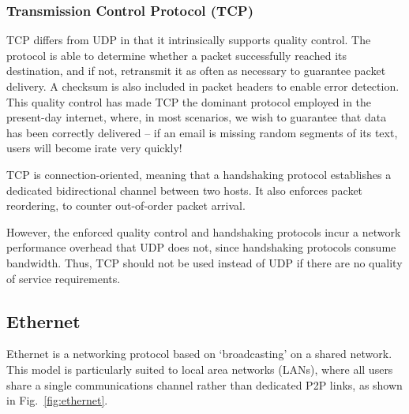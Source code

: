 \documentclass[aps,rmp,twocolumn,amsmath,amssymb,nofootinbib,superscriptaddress,longbibliography,floatfix,table-of-contents,eqsecnum]{revtex4-1}
\begin{document}
\subsubsection{Transmission Control Protocol (TCP)} \label{sec:TCP} 

TCP differs from UDP in that it intrinsically supports quality control. The protocol is able to determine whether a packet successfully reached its destination, and if not, retransmit it as often as necessary to guarantee packet delivery. A checksum is also included in packet headers to enable error detection. This quality control has made TCP the dominant protocol employed in the present-day internet, where, in most scenarios, we wish to guarantee that data has been correctly delivered -- if an email is missing random segments of its text, users will become irate very quickly!

TCP is connection-oriented, meaning that a handshaking protocol establishes a dedicated bidirectional channel between two hosts. It also enforces packet reordering, to counter out-of-order packet arrival.

However, the enforced quality control and handshaking protocols incur a network performance overhead that UDP does not, since handshaking protocols consume bandwidth. Thus, TCP should not be used instead of UDP if there are no quality of service requirements.

%
%

\subsection{Ethernet} 

Ethernet is a networking protocol based on `broadcasting' on a shared network. This model is particularly suited to local area networks (LANs), where all users share a single communications channel rather than dedicated P2P links, as shown in Fig.~\ref{fig:ethernet}.
\end{document}
